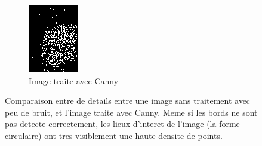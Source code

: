 \documentclass[a4paper, 12pt, titlepage, oneside]{article}
\begin{document}
\begin{figure}[]
		\begin{subfigure}[b]{0.4\linewidth}
			\includegraphics[width=\linewidth]{CANNY_ExempleDetailsB.png}
			\caption{Image traite avec Canny}
		\end{subfigure}
		\caption{Comparaison entre de details entre une image sans traitement avec peu de bruit, et l'image traite avec Canny. Meme si les bords ne sont pas detecte correctement, les lieux d'interet de l'image (la forme circulaire) ont tres visiblement une haute densite de points.}
		\label{fig:CannyDetails}
	\end{figure}
\end{document}
